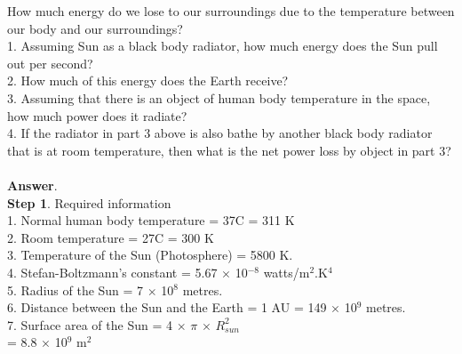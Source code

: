 \documentclass[11pt]{exam}
\begin{document}
\begin{questions}
\question
\label{Q20:Black body radiation}
How much energy do we lose to our surroundings due to the temperature between our body and our surroundings? \\
1. Assuming Sun as a black body radiator, how much energy does the Sun pull out per second?\\
2. How much of this energy does the Earth receive? \\
3. Assuming that there is an object of human body temperature in the space, how much power does it radiate? \\
4. If the radiator in part 3 above is also bathe by another black body radiator that is at room temperature, then what is the net power loss by object in part 3? \\ \\
\textbf{Answer}. \\ 
\textbf{Step 1}. Required information \\
                1. Normal human body temperature = 37\textdegree{}C  = 311 K\\
                2. Room temperature = 27\textdegree{}C = 300 K \\
                3. Temperature of the Sun (Photosphere) = 5800 K. \\
                4. Stefan-Boltzmann's constant = 5.67 $\times$ 10$^{-8}$ watts/m$^{2}$.K$^{4}$ \\
                5. Radius of the Sun = 7 $\times$ 10$^{8}$ metres.\\
                6. Distance between the Sun and the Earth = 1 AU = 149 $\times$ 10$^{9}$ metres. \\
                7. Surface area of the Sun = 4 $\times$ $\pi$ $\times$  $R_{sun}^{2}$   \\
                                           = 8.8 $\times$ 10$^{9}$ m$^{2}$\\  \\
\end{questions}
\end{document}
